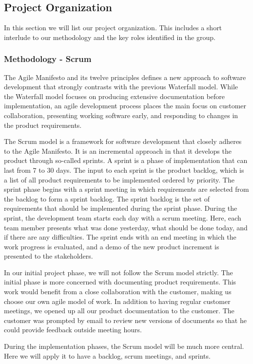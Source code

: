 \documentclass[../document.tex]{subfiles}
\begin{document}
\subsection{Project Organization}
In this section we will list our project organization. This includes a short interlude to our methodology and the key roles identified in the group.

\subsubsection{Methodology - Scrum}
The Agile Manifesto and its twelve principles defines a new approach to software development that strongly contrasts with the previous Waterfall model. While the Waterfall model focuses on producing extensive documentation before implementation, an agile development process places the main focus on customer collaboration, presenting working software early, and responding to changes in the product requirements. 

The Scrum model is a framework for software development that closely adheres to the Agile Manifesto. It is an incremental approach in that it develops the product through so-called sprints. A sprint is a phase of implementation that can last from 7 to 30 days. The input to each sprint is the product backlog, which is a list of all product requirements to be implemented ordered by priority. The sprint phase begins with a sprint meeting in which requirements are selected from the backlog to form a sprint backlog. The sprint backlog is the set of requirements that should be implemented during the sprint phase. During the sprint, the development team starts each day with a scrum meeting. Here, each team member presents what was done yesterday, what should be done today, and if there are any difficulties. The sprint ends with an end meeting in which the work progress is evaluated, and a demo of the new product increment is presented to the stakeholders.

In our initial project phase, we will not follow the Scrum model strictly. The initial phase is more concerned with documenting product requirements. This work would benefit from a close collaboration with the customer, making us choose our own agile model of work. In addition to having regular customer meetings, we opened up all our product documentation to the customer. The customer was prompted by email to review new versions of documents so that he could provide feedback outside meeting hours.

During the implementation phases, the Scrum model will be much more central. Here we will apply it to have a backlog, scrum meetings, and sprints.
\end{document}
